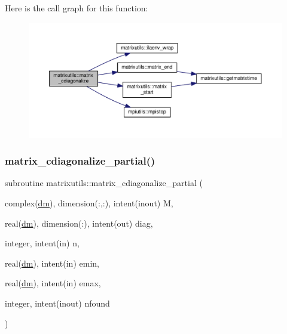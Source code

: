 Here is the call graph for this function\+:
\nopagebreak
\begin{figure}[H]
\begin{center}
\leavevmode
\includegraphics[width=350pt]{namespacematrixutils_a29011a04a13e1b49c36d226591b3e5a4_cgraph}
\end{center}
\end{figure}
\mbox{\label{namespacematrixutils_a30f09f7f2856414c7cfdc635a108039a}} 
\subsubsection{\texorpdfstring{matrix\+\_\+cdiagonalize\+\_\+partial()}{matrix\_cdiagonalize\_partial()}}
{\footnotesize\ttfamily subroutine matrixutils\+::matrix\+\_\+cdiagonalize\+\_\+partial (\begin{DoxyParamCaption}\item[{complex(\mbox{\hyperlink{namespacematrixutils_a7bdc564986ea4d90f51201c75606ef3d}{dm}}), dimension(\+:,\+:), intent(inout)}]{M,  }\item[{real(\mbox{\hyperlink{namespacematrixutils_a7bdc564986ea4d90f51201c75606ef3d}{dm}}), dimension(\+:), intent(out)}]{diag,  }\item[{integer, intent(in)}]{n,  }\item[{real(\mbox{\hyperlink{namespacematrixutils_a7bdc564986ea4d90f51201c75606ef3d}{dm}}), intent(in)}]{emin,  }\item[{real(\mbox{\hyperlink{namespacematrixutils_a7bdc564986ea4d90f51201c75606ef3d}{dm}}), intent(in)}]{emax,  }\item[{integer, intent(inout)}]{nfound }\end{DoxyParamCaption})}



